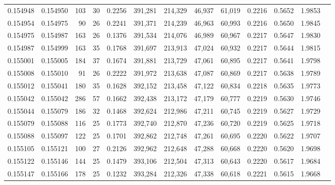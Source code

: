 \begin{tabular}{rrrrrrrrrrrrr}
0.154948 & 0.154950 &   103 &  30 &                                     0.2256 & 391,281 & 214,329 &  46,937 &  61,019 & 0.2216 & 0.5652 & 1.9853 \\
0.154954 & 0.154975 &    90 &  26 &                                     0.2241 & 391,371 & 214,239 &  46,963 &  60,993 & 0.2216 & 0.5650 & 1.9845 \\
0.154975 & 0.154987 &   163 &  26 &                                     0.1376 & 391,534 & 214,076 &  46,989 &  60,967 & 0.2217 & 0.5647 & 1.9830 \\
0.154987 & 0.154999 &   163 &  35 &                                     0.1768 & 391,697 & 213,913 &  47,024 &  60,932 & 0.2217 & 0.5644 & 1.9815 \\
0.155001 & 0.155005 &   184 &  37 &                                     0.1674 & 391,881 & 213,729 &  47,061 &  60,895 & 0.2217 & 0.5641 & 1.9798 \\
0.155008 & 0.155010 &    91 &  26 &                                     0.2222 & 391,972 & 213,638 &  47,087 &  60,869 & 0.2217 & 0.5638 & 1.9789 \\
0.155012 & 0.155041 &   180 &  35 &                                     0.1628 & 392,152 & 213,458 &  47,122 &  60,834 & 0.2218 & 0.5635 & 1.9773 \\
0.155042 & 0.155042 &   286 &  57 &                                     0.1662 & 392,438 & 213,172 &  47,179 &  60,777 & 0.2219 & 0.5630 & 1.9746 \\
0.155044 & 0.155079 &   186 &  32 &                                     0.1468 & 392,624 & 212,986 &  47,211 &  60,745 & 0.2219 & 0.5627 & 1.9729 \\
0.155079 & 0.155088 &   116 &  25 &                                     0.1773 & 392,740 & 212,870 &  47,236 &  60,720 & 0.2219 & 0.5625 & 1.9718 \\
0.155088 & 0.155097 &   122 &  25 &                                     0.1701 & 392,862 & 212,748 &  47,261 &  60,695 & 0.2220 & 0.5622 & 1.9707 \\
0.155105 & 0.155121 &   100 &  27 &                                     0.2126 & 392,962 & 212,648 &  47,288 &  60,668 & 0.2220 & 0.5620 & 1.9698 \\
0.155122 & 0.155146 &   144 &  25 &                                     0.1479 & 393,106 & 212,504 &  47,313 &  60,643 & 0.2220 & 0.5617 & 1.9684 \\
0.155147 & 0.155166 &   178 &  25 &                                     0.1232 & 393,284 & 212,326 &  47,338 &  60,618 & 0.2221 & 0.5615 & 1.9668 \\

\end{tabular}
